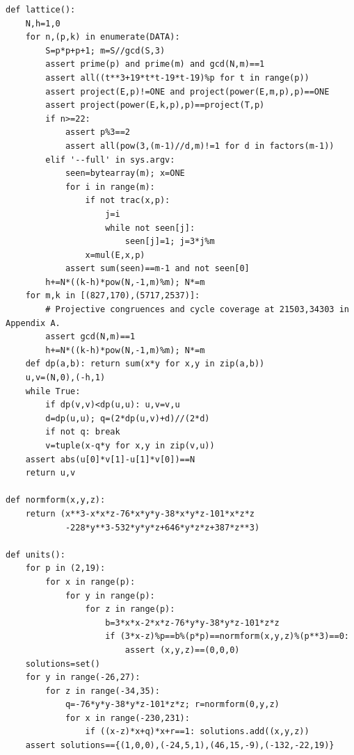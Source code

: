 \documentclass[11pt,a4paper,oneside,openany]{book}
\begin{document}
\begin{Verbatim}[fontsize=\footnotesize,breaklines,breakanywhere]
def lattice():
    N,h=1,0
    for n,(p,k) in enumerate(DATA):
        S=p*p+p+1; m=S//gcd(S,3)
        assert prime(p) and prime(m) and gcd(N,m)==1
        assert all((t**3+19*t*t-19*t-19)%p for t in range(p))
        assert project(E,p)!=ONE and project(power(E,m,p),p)==ONE
        assert project(power(E,k,p),p)==project(T,p)
        if n>=22:
            assert p%3==2
            assert all(pow(3,(m-1)//d,m)!=1 for d in factors(m-1))
        elif '--full' in sys.argv:
            seen=bytearray(m); x=ONE
            for i in range(m):
                if not trac(x,p):
                    j=i
                    while not seen[j]:
                        seen[j]=1; j=3*j%m
                x=mul(E,x,p)
            assert sum(seen)==m-1 and not seen[0]
        h+=N*((k-h)*pow(N,-1,m)%m); N*=m
    for m,k in [(827,170),(5717,2537)]:
        # Projective congruences and cycle coverage at 21503,34303 in Appendix A.
        assert gcd(N,m)==1
        h+=N*((k-h)*pow(N,-1,m)%m); N*=m
    def dp(a,b): return sum(x*y for x,y in zip(a,b))
    u,v=(N,0),(-h,1)
    while True:
        if dp(v,v)<dp(u,u): u,v=v,u
        d=dp(u,u); q=(2*dp(u,v)+d)//(2*d)
        if not q: break
        v=tuple(x-q*y for x,y in zip(v,u))
    assert abs(u[0]*v[1]-u[1]*v[0])==N
    return u,v

def normform(x,y,z):
    return (x**3-x*x*z-76*x*y*y-38*x*y*z-101*x*z*z
            -228*y**3-532*y*y*z+646*y*z*z+387*z**3)

def units():
    for p in (2,19):
        for x in range(p):
            for y in range(p):
                for z in range(p):
                    b=3*x*x-2*x*z-76*y*y-38*y*z-101*z*z
                    if (3*x-z)%p==b%(p*p)==normform(x,y,z)%(p**3)==0:
                        assert (x,y,z)==(0,0,0)
    solutions=set()
    for y in range(-26,27):
        for z in range(-34,35):
            q=-76*y*y-38*y*z-101*z*z; r=normform(0,y,z)
            for x in range(-230,231):
                if ((x-z)*x+q)*x+r==1: solutions.add((x,y,z))
    assert solutions=={(1,0,0),(-24,5,1),(46,15,-9),(-132,-22,19)}


\end{Verbatim}
\end{document}
